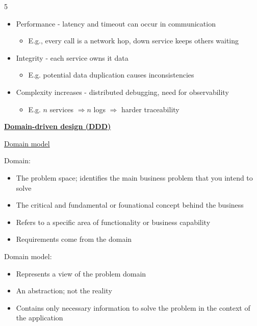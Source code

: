 \documentclass[landscape,a4paper]{extarticle}
\begin{document}
\begin{multicols*}{5}
    \begin{itemize}
        \item Performance - latency and timeout can occur in communication
        \begin{itemize}
            \item E.g., every call is a network hop, down service keeps others waiting
        \end{itemize}
        \item Integrity - each service owns it data
        \begin{itemize}
            \item E.g. potential data duplication causes inconsistencies
        \end{itemize}
        \item Complexity increases - distributed debugging, need for observability
        \begin{itemize}
            \item E.g. $n$ services $\Rightarrow n$ logs $\Rightarrow$ harder traceability
        \end{itemize}
    \end{itemize}

    \textbf{\uline{Domain-driven design (DDD)}}

    \uline{Domain model}

    Domain:

    \begin{itemize}
        \item The problem space; identifies the main business problem that you intend to solve
        \item The critical and fundamental or founational concept behind the business
        \item Refers to a specific area of functionality or business capability
        \item Requirements come from the domain
    \end{itemize}

    Domain model:

    \begin{itemize}
        \item Represents a view of the problem domain
        \item An abstraction; not the reality
        \item Contains only necessary information to solve the problem in the context of the application
    \end{itemize}


\end{multicols*}
\end{document}
